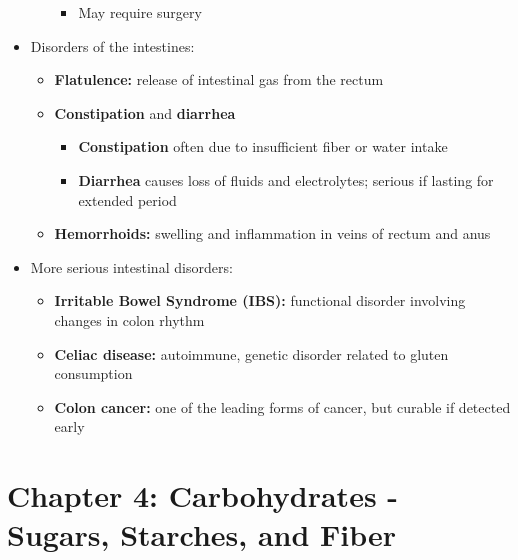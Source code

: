 \documentclass[12pt]{article}
\begin{document}
\begin{itemize}
\begin{itemize}
                            \begin{itemize}
                                \item May require surgery
                            \end{itemize}
                    \end{itemize}
                \item Disorders of the intestines:
                    \begin{itemize}
                        \item \textbf{Flatulence:} release of intestinal gas from the rectum
                        \item \textbf{Constipation} and \textbf{diarrhea}
                            \begin{itemize}
                                \item \textbf{Constipation} often due to insufficient fiber or water intake
                                \item \textbf{Diarrhea} causes loss of fluids and electrolytes; serious if lasting for extended period
                            \end{itemize}
                        \item \textbf{Hemorrhoids:} swelling and inflammation in veins of rectum and anus
                    \end{itemize}
                \item More serious intestinal disorders:
                    \begin{itemize}
                        \item \textbf{Irritable Bowel Syndrome (IBS):} functional disorder involving changes in colon rhythm
                        \item \textbf{Celiac disease:} autoimmune, genetic disorder related to gluten consumption
                        \item \textbf{Colon cancer:} one of the leading forms of cancer, but curable if detected early
                    \end{itemize}
            \end{itemize}

    \section{Chapter 4: Carbohydrates - Sugars, Starches, and Fiber}
\end{document}
